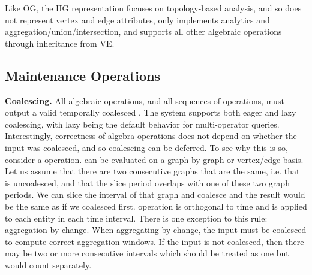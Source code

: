 Like OG, the HG representation focuses on topology-based analysis, and
so does not represent vertex and edge attributes, only implements
analytics and aggregation/union/intersection, and supports all other
algebraic operations through inheritance from VE.

\subsection{Maintenance Operations}
\label{sec:sys:maint}


{\bf Coalescing.}  All algebraic operations, and all sequences of
operations, must output a valid temporally coalesced \tg.  The \ql
system supports both eager and lazy coalescing, with lazy being the
default behavior for multi-operator queries.  Interestingly,
correctness of \tg algebra operations does not depend on whether the
input was coalesced, and so coalescing can be deferred.  To see why
this is so, consider a  operation.   can be
evaluated on a graph-by-graph or vertex/edge basis.  Let us assume
that there are two consecutive graphs that are the same, i.e. that \sg
is uncoalesced, and that the slice period overlaps with one of these
two graph periods. We can slice the interval of that graph and
coalesce and the result would be the same as if we coalesced first.
 operation is orthogonal to time and is applied to each
entity in each time interval.  There is one exception to this rule:
aggregation by change.  When aggregating by change, the input must be
coalesced to compute correct aggregation windows.  If the input is not
coalesced, then there may be two or more consecutive intervals which
should be treated as one but would count separately.

